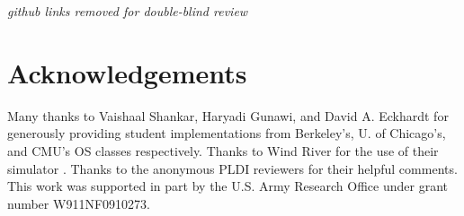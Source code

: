 \documentclass[pldi]{sigplanconf-pldi15}
\begin{document}

{\em github links removed for double-blind review}
%

\section{Acknowledgements}

Many thanks to Vaishaal Shankar, Haryadi Gunawi, and David A. Eckhardt for generously providing student implementations from Berkeley's, U. of Chicago's, and CMU's OS classes respectively.
Thanks to Wind River for the use of their simulator \simics.
Thanks to
the anonymous PLDI reviewers for their helpful comments.
This work was supported in part by
the U.S. Army Research Office under grant number W911NF0910273.



{}
\end{document}

